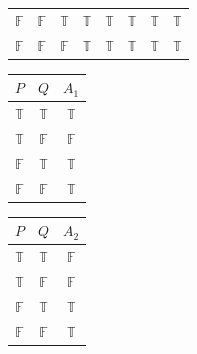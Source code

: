 \documentclass[a4paper,12pt]{article}
\begin{document}
\begin{enumerate}
\begin{enumerate}
\begin{table}[htp]
\begin{tabular}{|c|c|c|c|c|c|c|c|}
$\mathbb{F}$              & $\mathbb{F}$             & $\mathbb{T}$             & $\mathbb{T}$                   & $\mathbb{T}$                                 & $\mathbb{T}$                           & $\mathbb{T}$                                         & $\mathbb{T}$                                                                             \\
$\mathbb{F}$              & $\mathbb{F}$             & $\mathbb{F}$             & $\mathbb{T}$                   & $\mathbb{T}$                                 & $\mathbb{T}$                           & $\mathbb{T}$                                         & $\mathbb{T}$   \\\hline                                                                         
\end{tabular}
\end{table}\begin{center}
\begin{table}[!htb]
\centering
    \begin{minipage}{.2\linewidth}
      \centering
        \begin{tabular}{|c|c|c|}\hline 
$P$          & $Q$          & $A_1$        \\\hline
$\mathbb{T}$ & $\mathbb{T}$ & $\mathbb{T}$ \\
$\mathbb{T}$ & $\mathbb{F}$ & $\mathbb{F}$ \\
$\mathbb{F}$ & $\mathbb{T}$ & $\mathbb{T}$ \\
$\mathbb{F}$ & $\mathbb{F}$ & $\mathbb{T}$ \\\hline
\end{tabular}
    \end{minipage}%
    \begin{minipage}{.2\linewidth}
      \centering
        \begin{tabular}{|c|c|c|}\hline
$P$          & $Q$          & $A_2$        \\\hline
$\mathbb{T}$ & $\mathbb{T}$ & $\mathbb{F}$ \\
$\mathbb{T}$ & $\mathbb{F}$ & $\mathbb{F}$ \\
$\mathbb{F}$ & $\mathbb{T}$ & $\mathbb{T}$ \\
$\mathbb{F}$ & $\mathbb{F}$ & $\mathbb{T}$ \\\hline
\end{tabular}
    \end{minipage}%
    \begin{minipage}{.2\linewidth}
      \centering
        \begin{tabular}{|c|c|c|}\hline

\end{tabular}
\end{minipage}
\end{table}
\end{center}
\end{enumerate}
\end{enumerate}
\end{document}
